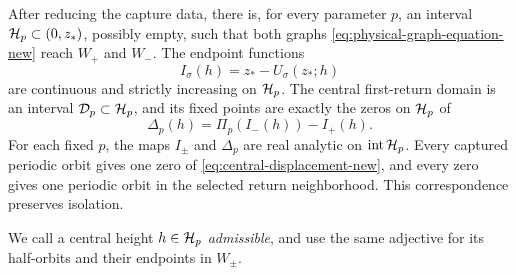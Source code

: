 \begin{proposition}
\label{prop:central-displacement-interval-new}
After reducing the capture data, there is, for every parameter
$p$, an interval $\mathcal H_p\subset(0,z_*)$, possibly empty, such that both graphs
\eqref{eq:physical-graph-equation-new} reach $W_+$ and $W_-$.  The endpoint
functions
\begin{equation}
\label{eq:endpoint-functions-new}
 I_\sigma(h)=z_*-U_\sigma(z_*;h)
\end{equation}
are continuous and strictly increasing on $\mathcal H_p$.  The central first-return
domain is an interval $\mathcal D_p\subset\mathcal H_p$, and its fixed points are exactly
the zeros on $\mathcal H_p$ of
\begin{equation}
\label{eq:central-displacement-new}
 \Delta_p(h)=\Pi_p(I_-(h))-I_+(h).
\end{equation}
For each fixed \(p\), the maps \(I_\pm\) and \(\Delta_p\) are real
analytic on \(\operatorname{int}\mathcal H_p\).
Every captured periodic orbit gives one zero of
\eqref{eq:central-displacement-new}, and every zero gives one periodic
orbit in the selected return neighborhood.  This correspondence preserves
isolation.
\end{proposition}

We call a central height \(h\in\mathcal H_p\) \emph{admissible}, and use the
same adjective for its half-orbits and their endpoints in \(W_\pm\).

